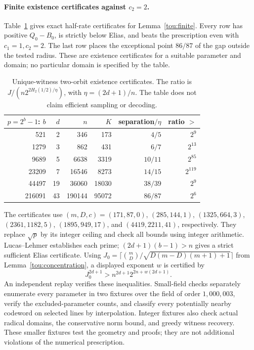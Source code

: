 \paragraph{Finite existence certificates against $c_2=2$.}
Table~\ref{tab:two-orbit} gives exact half-rate certificates for
Lemma~\ref{tou:finite}. Every row has positive $Q_0-B_0$, is strictly
below Elias, and beats the prescription even with $c_1=1,c_2=2$.
The last row places the exceptional point $86/87$ of the gap outside
the tested radius. These are existence certificates for a suitable
parameter and domain; no particular domain is specified by the table.

\begin{table}[tb]
\centering
\begin{tabular}{rrrrrr}
\toprule
$p=2^b-1$: $b$ & $d$ & $n$ & $K$ & separation$/\eta$ & ratio $>$\\
\midrule
521 & 2 & 346 & 173 & $4/5$ & $2^{9}$\\
1279 & 3 & 862 & 431 & $6/7$ & $2^{13}$\\
9689 & 5 & 6638 & 3319 & $10/11$ & $2^{85}$\\
23209 & 7 & 16546 & 8273 & $14/15$ & $2^{119}$\\
44497 & 19 & 36060 & 18030 & $38/39$ & $2^{9}$\\
216091 & 43 & 190144 & 95072 & $86/87$ & $2^{6}$\\
\bottomrule
\end{tabular}
\caption{Unique-witness two-orbit existence certificates. The ratio is
$J/(n2^{2H_2(1/2)/\eta})$, with $\eta=(2d+1)/n$.
The table does not claim efficient sampling or decoding.}
\label{tab:two-orbit}
\end{table}

The certificates use $(m,D,c)=(171,87,0)$, $(285,144,1)$,
$(1325,664,3)$, $(2361,1182,5)$, $(1895,949,17)$, and
$(4419,2211,41)$, respectively.
They replace $\sqrt p$ by its integer ceiling and check all bounds
using integer arithmetic. Lucas--Lehmer establishes each prime;
$(2d+1)(b-1)>n$ gives a strict sufficient Elias certificate.
Using $J_0=\lceil\binom mD/\sqrt{D(m-D)(m+1)+1}\rceil$
from Lemma~\ref{tou:concentration}, a displayed exponent $w$ is certified by
\[
 J_0^{2d+1}>n^{2d+1}2^{2n+w(2d+1)}.
\]
An independent replay verifies these inequalities.
Small-field checks separately enumerate every parameter in two fixtures
over the field of order $1{,}000{,}003$, verify the excluded-parameter counts, and
classify every potentially nearby codeword on selected lines by
interpolation. Integer fixtures also check actual radical domains,
the conservative norm bound, and greedy witness recovery.
These smaller fixtures test the geometry and proofs; they are not
additional violations of the numerical prescription.

